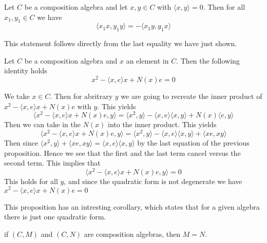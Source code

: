 \documentclass[../Thesis.tex]{subfiles}
\begin{document}
\begin{Cor}
Let $C$ be a composition algebra and let $x,y \in C$ with $\langle x,y \rangle = 0$. Then for all $x_1, y_1 \in C$ we have
\begin{equation}
\langle x_1x, y_1y \rangle = -\langle x_1y, y_1 x \rangle
\end{equation}
\end{Cor}
\begin{myproof}
This statement follows directly from the last equality we have just shown.
\end{myproof}

\begin{prop}
Let $C$ be a composition algebra and $x$ an element in $C$. Then the following identity holds
\begin{equation}
x^2 - \langle x,e \rangle x + N(x)e = 0
\end{equation}
\end{prop}
\begin{myproof}
We take $x \in C$. Then for abritrary $y$ we are going to recreate the inner product of $x^2 - \langle x,e \rangle x + N(x)e$ with $y$. This yields
\begin{equation*}
\langle x^2 - \langle x,e \rangle x + N(x)e, y \rangle = \langle x^2,y \rangle - \langle x, e \rangle \langle x, y \rangle + N(x) \langle e , y \rangle
\end{equation*}
Then we can take in the $N(x)$ into the inner product. This yields
\begin{equation*}
\langle x^2 - \langle x,e \rangle x + N(x)e, y \rangle = \langle x^2,y \rangle - \langle x, e \rangle \langle x, y \rangle + \langle xe, xy \rangle
\end{equation*}
Then since $\langle x^2,y \rangle + \langle xe, xy \rangle = \langle x,e \rangle \langle x,y \rangle$ by the last equation of the previous proposition. Hence we see that the first and the last term cancel versus the second term. This implies that 
\begin{equation*}
\langle x^2 - \langle x,e \rangle x + N(x)e, y \rangle = 0
\end{equation*}
This holds for all $y$, and since the quadratic form is not degenerate we have $x^2 - \langle x,e \rangle x + N(x)e = 0$
\end{myproof}
This proposition has an intresting corollary, which states that for a given algebra there is just one quadratic form.
\begin{Cor}
if $(C,M)$ and $(C,N)$ are composition algebras, then $M = N$.
\end{Cor}
\end{document}
